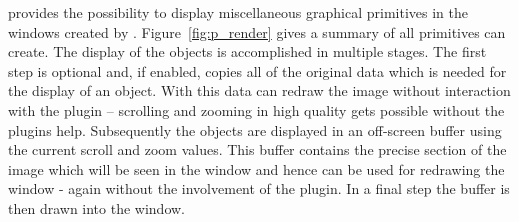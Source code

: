 \icewing{} provides the possibility to display miscellaneous
graphical primitives in the windows created by
. Figure~\ref{fig:p_render} gives a
summary of all primitives \icewing{} can create. The display of the
objects is accomplished in multiple stages. The first step is
optional and, if enabled, copies all of the original data which is
needed for the display of an object. With this data \icewing{} can
redraw the image without interaction with the plugin -- scrolling
and zooming in high quality gets possible without the plugins
help. Subsequently the objects are displayed in an off-screen buffer
using the current scroll and zoom values. This buffer contains the
precise section of the image which will be seen in the window and
hence can be used for redrawing the window - again without the
involvement of the plugin. In a final step the buffer is then drawn
into the window.

